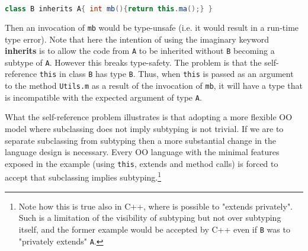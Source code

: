 \begin{lstlisting}[language=Java]
  class B inherits A{ int mb(){return this.ma();} }
\end{lstlisting}

\noindent Then an invocation of 
\lstinline{mb} would be type-unsafe (i.e. it would 
result in a run-time type error). 
Note that here the intention of using the imaginary keyword {\bf
  inherits} is to allow the code from \lstinline{A} to be inherited 
without \lstinline{B} becoming a subtype of \lstinline{A}. 
However this breaks type-safety. The problem is that the
self-reference \lstinline{this} in class \lstinline{B} has 
type \lstinline{B}. Thus, when \lstinline{this} is passed as an argument to 
the method \lstinline{Utils.m} as a result of the invocation of
\lstinline{mb}, it will have a type that is incompatible with the
expected argument of type \lstinline{A}.  

What the self-reference problem illustrates is that adopting a more flexible
OO model where subclassing does not imply subtyping is not trivial. 
If we are to separate subclassing from subtyping then a more substantial
change in the language design is necessary.  Every OO language with
the minimal features exposed in the example (using \lstinline{this},
extends and method calls) is forced to accept that subclassing implies
subtyping.\footnote{ Note how this is true also in C++, where is
  possible to "extends privately". Such is a limitation of the
  visibility of subtyping but not over subtyping itself, and the
  former example would be accepted by C++ even if \lstinline{B} was to
  "privately extends" \lstinline{A}.}


\begin{comment}
An iconic example on why connecting inheritance/code reuse and
subtpying is problematic is provided by the
historic\cite{LaLonde:1991:SSS:110673.110679}: A reasonable
implementation for a \Q@Set@ may be easy to extend into a \Q@Bag@
keeping tracks of how many times an element occurs.  We would just add
some state and override a couple of methods.\bruno{Are we going to
  present this example in the paper solved in 42, for example? 
I think I would expect to see it.}

However, our subclassing would break Liskov substitution principle (LSP)~\cite{martin2000design}: not all bags are sets!
Of course, one could retroactivelly fix this problem by introducing \Q@AbstractSetOrBag@
and making both \Q@Bag@ and \Q@Set@ inherit from it.
This looks unnatural, since \Q@Set@ would extend it without adding anything,
and we would be surprised to find a use of the type \Q@AbstractSetOrBag@.
Worst, if we was to constantly apply this mentalty, we would introduce a very high number
of abstract classes that are not supposed to be used as types, and that will clutter the 
public interface of our classes and our code project as a whole.
\end{comment}

